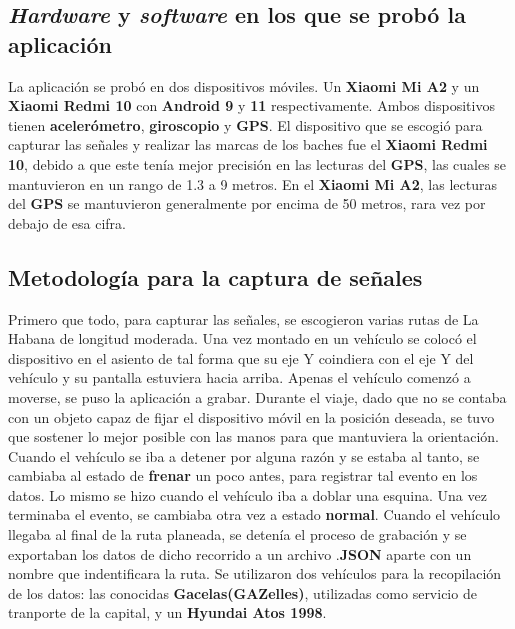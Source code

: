	\subsection{\emph{Hardware} y \emph{software} en los que se probó la aplicación}
		La aplicación se probó en dos dispositivos móviles. Un \textbf{Xiaomi Mi A2} y un \textbf{Xiaomi Redmi 10} con \textbf{Android 9} y
		\textbf{11} respectivamente. Ambos dispositivos tienen \textbf{acelerómetro}, \textbf{giroscopio} y \textbf{GPS}. El dispositivo que 
		se escogió para capturar las señales y realizar las marcas de los baches fue el \textbf{Xiaomi Redmi 10}, debido a que este tenía mejor
		precisión en las lecturas del \textbf{GPS}, las cuales se mantuvieron en un rango de 1.3 a 9 metros. En el \textbf{Xiaomi Mi A2}, las 
		lecturas del \textbf{GPS} se mantuvieron generalmente por encima de 50 metros, rara vez por debajo de esa cifra.

	\subsection{Metodología para la captura de señales}
		Primero que todo, para capturar las señales, se escogieron varias rutas de La Habana de longitud moderada. Una vez montado en un vehículo
		se colocó el dispositivo en el asiento de tal forma que su eje Y coindiera con el eje Y del vehículo y su pantalla estuviera hacia arriba.
		Apenas el vehículo comenzó a moverse, se puso la aplicación a grabar. Durante el viaje, dado que no se contaba con un objeto capaz de fijar el
		dispositivo móvil en la posición deseada, se tuvo que sostener lo mejor posible con las manos para que mantuviera la orientación. \\
		\indent Cuando el vehículo se iba a detener por alguna razón y se estaba al tanto, se cambiaba al estado de \textbf{frenar} un poco antes, para
		registrar tal evento en los datos. Lo mismo se hizo cuando el vehículo iba a doblar una esquina. Una vez terminaba el evento, se cambiaba otra
		vez a estado \textbf{normal}. Cuando el vehículo llegaba al final de la ruta planeada, se detenía el proceso de grabación y se exportaban los
		datos de dicho recorrido a un archivo .\textbf{JSON} aparte con un nombre que indentificara la ruta. Se utilizaron dos vehículos para la
		recopilación de los datos: las conocidas \textbf{Gacelas(GAZelles)}, utilizadas como servicio de tranporte de la capital,  
		y un \textbf{Hyundai Atos 1998}.

